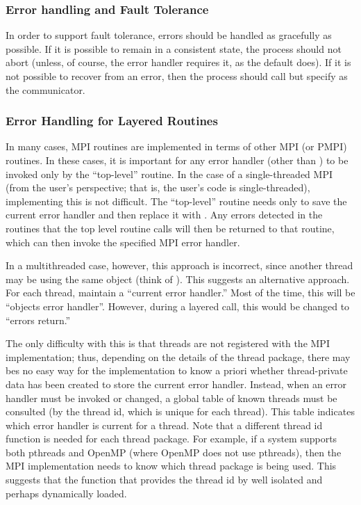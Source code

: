 \documentclass{article}
\begin{document}
 

\subsubsection{Error handling and Fault Tolerance}
\label{sec:errs-and-faults}
In order to support fault tolerance, errors should be handled as
gracefully as possible.  If it is possible to remain in a consistent
state, the process should not abort (unless, of course, the error
handler requires it, as the default  does).  
If it is not possible to recover from an error, then the process
should call  but specify  as the
communicator.  

\subsubsection{Error Handling for Layered Routines}
\label{sec:err-handling-nested}
In many cases, MPI routines are implemented in terms of other MPI (or
PMPI) routines.  In these cases, it is important for any error handler
(other than ) to be invoked only by the
``top-level'' routine.  In the case of a single-threaded MPI (from the
user's perspective; that is, the user's code is single-threaded),
implementing this is not difficult.  The ``top-level'' routine needs
only to save the current error handler and then replace it with
.  Any errors detected in the routines
that the top level routine calls will then be returned to that
routine, which can then invoke the specified MPI error handler.

In a multithreaded case, however, this approach is incorrect, since
another thread may be using the same object (think of
).  This suggests an alternative approach.
For each thread, maintain a ``current error handler.''  Most of the
time, this will be ``objects error handler''.  However, during a
layered call, this would be changed to ``errors return.''  

The only difficulty with this is that threads are not registered with
the MPI implementation; thus, depending on the details of the thread package,
there may bes no easy way for the implementation
to know a priori whether thread-private data has been created to store
the current error handler.  Instead, when an error handler must be
invoked or changed, a global table of known threads must be consulted
(by the thread id, which is unique for each thread).  This table
indicates which error handler is current for a thread.  
Note that a different thread id function is needed for each thread
package.  For example, if a system supports both pthreads and OpenMP
(where OpenMP does not use pthreads), then the MPI implementation
needs to know which thread package is being used.  This suggests that
the function that provides the thread id by well isolated and perhaps
dynamically loaded.
\end{document}
